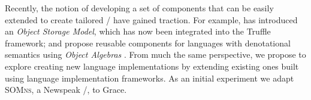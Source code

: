 Recently, the notion of developing a set of components that can be easily extended to create tailored \vms/ have gained traction. For example, \citet{WoB2014} has introduced an \emph{Object Storage Model}, which has now been integrated into the Truffle framework; and \citet{Inostroza2015} propose reusable components for languages with denotational semantics using \emph{Object Algebras} \cite{Oliveira2012}. From much the same perspective, we propose to explore creating new language implementations by extending existing ones built using language implementation frameworks. As an initial experiment we adapt \textsc{SOMns}, a Newspeak \vm/, to Grace.


%




%






% 
